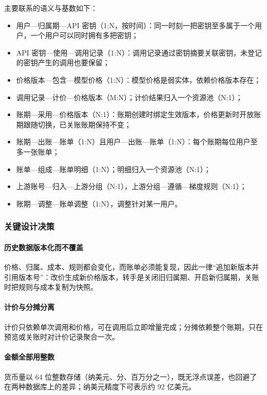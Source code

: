 主要联系的语义与基数如下：
\begin{itemize}
  \item 用户—归属期—API 密钥（1:N，按时间）：同一时刻一把密钥至多属于一个用户，一个用户可以同时拥有多把密钥；
  \item API 密钥—使用—调用记录（1:N）：调用记录通过密钥摘要关联密钥，未登记的密钥产生的调用也要保留；
  \item 价格版本—包含—模型价格（1:N）：模型价格是弱实体，依赖价格版本存在；
  \item 调用记录—计价—价格版本（M:N）；计价结果归入一个资源池（N:1）；
  \item 账期—采用—价格版本（N:1）：账期创建时绑定生效版本，价格更新时开放账期跟随切换，已关账账期保持不变；
  \item 账期—出账—账单（1:N）且用户—出账—账单（1:N）：每个账期每位用户至多一张账单；
  \item 账单—组成—账单明细（1:N）；明细归入一个资源池（N:1）；
  \item 上游账号—归入—上游分组（N:1），上游分组—遵循—梯度规则（N:1）；
  \item 账期—调整—账单调整（1:N），调整针对某一用户。
\end{itemize}

\subsubsection{关键设计决策}

\paragraph{历史数据版本化而不覆盖}
价格、归属、成本、规则都会变化，而账单必须能复现，因此一律“追加新版本并引用版本号”：改价生成新价格版本，转手是关闭旧归属期、开启新归属期，关账时把规则与成本复制为快照。

\paragraph{计价与分摊分离}
计价只依赖单次调用和价格，可在调用后立即增量完成；分摊依赖整个账期，只在预览或关账时对计价记录聚合一次。

\paragraph{金额全部用整数}
货币量以 64 位整数存储（纳美元、分、百万分之一），既无浮点误差，也回避了  在两种数据库上的差异；纳美元精度下可表示约 92 亿美元。
